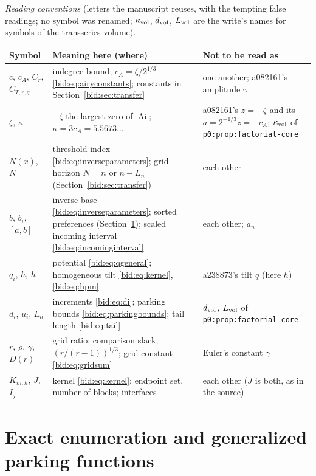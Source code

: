 \documentclass[11pt,letterpaper]{article}
\numberwithin{equation}{section}
\theoremstyle{remark}\newtheorem{remark}[theorem]{Remark}
\DeclareMathOperator{\Ai}{Ai}
\newcommand{\file}[1]{\nolinkurl{#1}}
\begin{document}
\medskip\noindent\begin{minipage}{\textwidth}
\emph{Reading conventions} (letters the manuscript reuses, with the tempting
false readings; no symbol was renamed; $\kappa_{\rm vol}$, $d_{\rm vol}$,
$L_{\rm vol}$ are the write's names for symbols of the transseries volume).\par
\smallskip
\begingroup\small\renewcommand{\arraystretch}{1.1}
\noindent\begin{tabular}{@{}>{\raggedright\arraybackslash}p{0.95in}>{\raggedright\arraybackslash}p{3.0in}>{\raggedright\arraybackslash}p{2.15in}@{}}
\toprule
Symbol & Meaning here (where) & Not to be read as\\
\midrule
$c$, $c_A$, $C_r$, $C_{T,r,q}$ & indegree bound; $c_A=\zeta/2^{1/3}$ \eqref{bid:eq:airyconstants}; constants in Section~\ref{bid:sec:transfer} & one another; a082161's amplitude $\gamma$\\
$\zeta$, $\kappa$ & $-\zeta$ the largest zero of $\Ai$; $\kappa=3c_A=5.5673\ldots$ & a082161's $z=-\zeta$ and its $a=2^{-1/3}z=-c_A$; $\kappa_{\rm vol}$ of \file{p0:prop:factorial-core}\\
$N(x)$, $N$ & threshold index \eqref{bid:eq:inverseparameters}; grid horizon $N=n$ or $n-L_n$ (Section~\ref{bid:sec:transfer}) & each other\\
$b$, $b_i$, $[a,b]$ & inverse base \eqref{bid:eq:inverseparameters}; sorted preferences (Section~\ref{bid:sec:exact}); scaled incoming interval \eqref{bid:eq:incominginterval} & each other; $a_n$\\
$q_i$, $h$, $h_\pm$ & potential \eqref{bid:eq:qgeneral}; homogeneous tilt \eqref{bid:eq:kernel}, \eqref{bid:eq:hpm} & a238873's tilt $q$ (here $h$)\\
$d_i$, $u_i$, $L_n$ & increments \eqref{bid:eq:di}; parking bounds \eqref{bid:eq:parkingbounds}; tail length \eqref{bid:eq:tail} & $d_{\rm vol}$, $L_{\rm vol}$ of \file{p0:prop:factorial-core}\\
$r$, $\rho$, $\gamma$, $D(r)$ & grid ratio; comparison slack; $(r/(r-1))^{1/3}$; grid constant \eqref{bid:eq:gridsum} & Euler's constant $\gamma$\\
$K_{m,h}$, $J$, $I_j$ & kernel \eqref{bid:eq:kernel}; endpoint set, number of blocks; interfaces & each other ($J$ is both, as in the source)\\
\bottomrule
\end{tabular}
\endgroup
\end{minipage}

\section{Exact enumeration and generalized parking functions}\label{bid:sec:exact}
\end{document}
